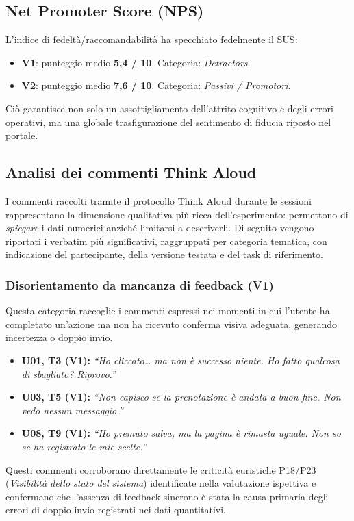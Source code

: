 \subsection{Net Promoter Score (NPS)}
L'indice di fedeltà/raccomandabilità ha specchiato fedelmente il SUS:
\begin{itemize}
    \item \textbf{V1}: punteggio medio \textbf{5,4 / 10}. Categoria: \textit{Detractors}.
    \item \textbf{V2}: punteggio medio \textbf{7,6 / 10}. Categoria: \textit{Passivi / Promotori}. 
\end{itemize}
Ciò garantisce non solo un assottigliamento dell'attrito cognitivo e degli errori operativi, ma una globale trasfigurazione del sentimento di fiducia riposto nel portale.

\subsection{Analisi dei commenti Think Aloud}
\label{sub:think_aloud_results}

I commenti raccolti tramite il protocollo Think Aloud durante le sessioni rappresentano la dimensione qualitativa più ricca dell'esperimento: permettono di \emph{spiegare} i dati numerici anziché limitarsi a descriverli. Di seguito vengono riportati i verbatim più significativi, raggruppati per categoria tematica, con indicazione del partecipante, della versione testata e del task di riferimento.

\subsubsection{Disorientamento da mancanza di feedback (V1)}
Questa categoria raccoglie i commenti espressi nei momenti in cui l'utente ha completato un'azione ma non ha ricevuto conferma visiva adeguata, generando incertezza o doppio invio.

\begin{itemize}
    \item \textbf{U01, T3 (V1):} \textit{``Ho cliccato… ma non è successo niente. Ho fatto qualcosa di sbagliato? Riprovo.''}
    \item \textbf{U03, T5 (V1):} \textit{``Non capisco se la prenotazione è andata a buon fine. Non vedo nessun messaggio.''}
    \item \textbf{U08, T9 (V1):} \textit{``Ho premuto salva, ma la pagina è rimasta uguale. Non so se ha registrato le mie scelte.''}
\end{itemize}
Questi commenti corroborano direttamente le criticità euristiche P18/P23 (\textit{Visibilità dello stato del sistema}) identificate nella valutazione ispettiva e confermano che l'assenza di feedback sincrono è stata la causa primaria degli errori di doppio invio registrati nei dati quantitativi.

